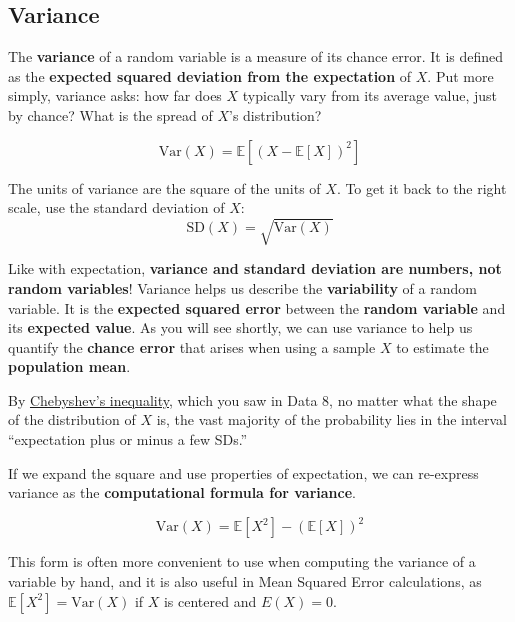 \documentclass[
  letterpaper,
  DIV=11,
  numbers=noendperiod]{scrreprt}
\begin{document}
\subsection{Variance}\label{variance}

The \textbf{variance} of a random variable is a measure of its chance
error. It is defined as the \textbf{expected squared deviation from the
expectation} of \(X\). Put more simply, variance asks: how far does
\(X\) typically vary from its average value, just by chance? What is the
spread of \(X\)'s distribution?

\[\text{Var}(X) = \mathbb{E}[(X-\mathbb{E}[X])^2]\]

The units of variance are the square of the units of \(X\). To get it
back to the right scale, use the standard deviation of \(X\):
\[\text{SD}(X) = \sqrt{\text{Var}(X)}\]

Like with expectation, \textbf{variance and standard deviation are
numbers, not random variables}! Variance helps us describe the
\textbf{variability} of a random variable. It is the \textbf{expected
squared error} between the \textbf{random variable} and its
\textbf{expected value}. As you will see shortly, we can use variance to
help us quantify the \textbf{chance error} that arises when using a
sample \(X\) to estimate the \textbf{population mean}.

By
\href{https://www.inferentialthinking.com/chapters/14/2/Variability.html\#Chebychev's-Bounds}{Chebyshev's
inequality}, which you saw in Data 8, no matter what the shape of the
distribution of \(X\) is, the vast majority of the probability lies in
the interval ``expectation plus or minus a few SDs.''

If we expand the square and use properties of expectation, we can
re-express variance as the \textbf{computational formula for variance}.

\[\text{Var}(X) = \mathbb{E}[X^2] - (\mathbb{E}[X])^2\]

This form is often more convenient to use when computing the variance of
a variable by hand, and it is also useful in Mean Squared Error
calculations, as \(\mathbb{E}[X^2] = \text{Var}(X)\) if \(X\) is
centered and \(E(X)=0\).
\end{document}
